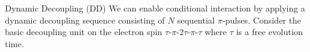 \documentclass[final]{beamer}
\newlength{\colwidth}
\begin{document}
\begin{frame}[t]
\begin{columns}[t]
\begin{column}{\colwidth}

  \begin{block}{Dynamic Decoupling (DD)}
    We can enable conditional interaction by applying a dynamic decoupling sequence consisting of $N$ sequential $\pi$-pulses.
    Consider the basic decoupling unit on the electron spin $\tau$-$\pi$-$2\tau$-$\pi$-$\tau$ where $\tau$ is a free evolution time.



\end{block}
\end{column}
\end{columns}
\end{frame}
\end{document}
